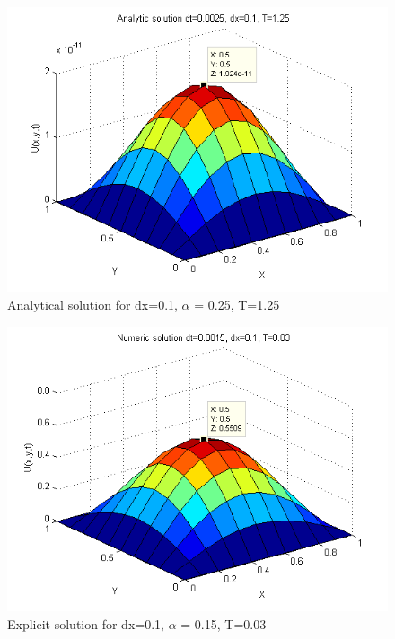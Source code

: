 \documentclass[a4paper,10pt]{article}
\begin{document}
\begin{figure}
  \begin{center}
    \includegraphics[scale=0.5]{ana_dt00025_dx01_T125}
    \caption{Analytical solution for dx=0.1, $\alpha$ = 0.25, T=1.25}
    \label{fig:Ana_dx0.1_dt0.0025T2}
  \end{center}
\end{figure}

\begin{figure}
  \begin{center}
    \includegraphics[scale=0.5]{num_dt00015_dx01_T003}
    \caption{Explicit solution for dx=0.1, $\alpha$ = 0.15, T=0.03}
    \label{fig:Num_alpha0.15}
  \end{center}

\end{figure}
\end{document}
